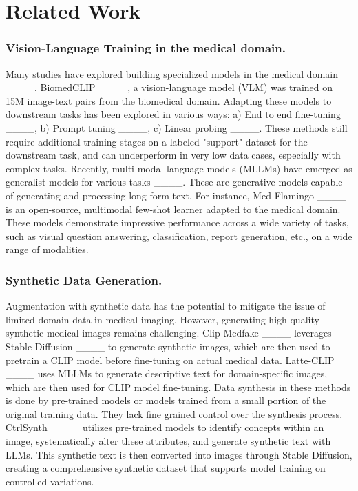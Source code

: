\section{Related Work}
\subsubsection{Vision-Language Training in the medical domain.}
Many studies have explored building specialized models in the medical domain ____. BiomedCLIP ____, a vision-language model (VLM) was trained on 15M image-text pairs from the biomedical domain. Adapting these models to downstream tasks has been explored in various ways: a) End to end fine-tuning ____,  b) Prompt tuning ____, c) Linear probing ____.  These methods still require additional training stages on a labeled "support" dataset for the downstream task, and can underperform in very low data cases, especially with complex tasks.  
Recently, multi-modal language models (MLLMs) have emerged as generalist models for various tasks ____. These are generative models capable of generating and processing long-form text. For instance, Med-Flamingo ____ is an open-source, multimodal few-shot learner adapted to the medical domain. These models demonstrate impressive performance across a wide variety of tasks, such as visual question answering, classification, report generation, etc., on a wide range of modalities.  


\subsubsection{Synthetic Data Generation.}

Augmentation with synthetic data has the potential to mitigate the issue of limited domain data in medical imaging. However, generating high-quality synthetic medical images remains challenging. Clip-Medfake ____ leverages Stable Diffusion ____ to generate synthetic images, which are then used to pretrain a CLIP model before fine-tuning on actual medical data. Latte-CLIP ____ uses MLLMs to generate descriptive text for domain-specific images, which are then used for CLIP model fine-tuning. Data synthesis in these methods is done by pre-trained models or models trained from a small portion of the original training data.  They lack fine grained control over the synthesis process. CtrlSynth ____ utilizes pre-trained models to identify concepts within an image, systematically alter these attributes, and generate synthetic text with LLMs. This synthetic text is then converted into images through Stable Diffusion, creating a comprehensive synthetic dataset that supports model training on controlled variations. 

